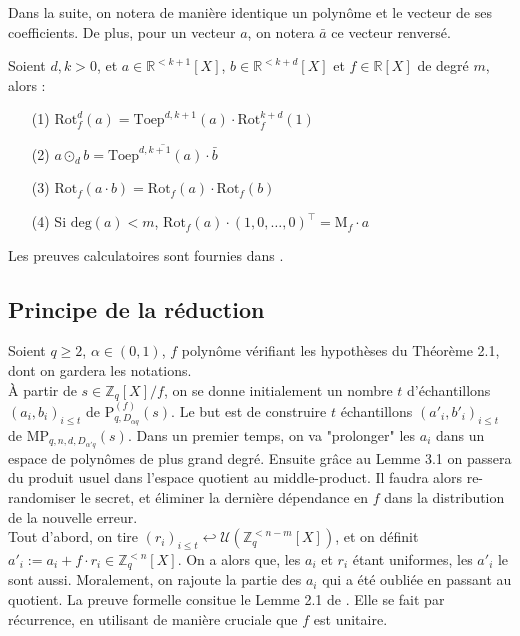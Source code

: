 \documentclass[11pt,a4paper]{article}
\begin{document}
Dans la suite, on notera de manière identique un polynôme et le vecteur de ses coefficients. De plus, pour un vecteur $a$, on notera $\bar a$ ce vecteur renversé. \\
\begin{lemma} Soient $d,k >0$, et $a \in \mathbb{R}^{<k+1}[X]$, $b \in \mathbb{R}^{<k+d}[X]$ et $f \in \mathbb{R}[X]$ de degré $m$, alors :
\begin{enumerate}
\item[(1)]$\text{Rot}^d_f(a) = \text{Toep}^{d,k+1}(a)\cdot\text{Rot}^{k+d}_f(1)$
\item[(2)] $a\odot_d b = \overline{\text{Toep}^{d,k+1}(a)\cdot \bar{b}}$
\item[(3)] $\text{Rot}_f(a\cdot b)=\text{Rot}_f(a)\cdot\text{Rot}_f(b)$
\item[(4)] Si $\text{deg}(a) < m$, $\text{Rot}_f(a)\cdot(1,0,\dots,0)^\top = \text{M}_f\cdot a$
\end{enumerate}
\end{lemma}
Les preuves calculatoires sont fournies dans \cite{mplwe}.

\subsection{Principe de la réduction}
Soient $q \geq 2$, $\alpha \in (0,1)$, $f$ polynôme vérifiant les hypothèses du Théorème 2.1, dont on gardera les notations. \\
 À partir de $s\in \mathbb{Z}_q[X]/f$, on se donne initialement un nombre $t$ d'échantillons $(a_i,b_i)_{i\leq t}$ de $\text{P}^{(f)}_{q,D_{\alpha q}}(s)$. Le but est de construire $t$ échantillons $(a'_i,b'_i)_{i\leq t}$ de $\text{MP}_{q,n,d,D_{\alpha'q}}(s)$. Dans un premier temps, on va "prolonger" les $a_i$ dans un espace de polynômes de plus grand degré. Ensuite grâce au Lemme 3.1 on passera du produit usuel dans l'espace quotient au middle-product. Il faudra alors re-randomiser le secret, et éliminer la dernière dépendance en $f$ dans la distribution de la nouvelle erreur. \\

Tout d'abord, on tire $(r_i)_{i\leq t} \hookleftarrow \mathcal{U}(\mathbb{Z}_q^{<n-m}[X])$, et on définit $a'_i := a_i + f\cdot r_i \in \mathbb{Z}_q^{<n}[X]$. On a alors que, les $a_i$ et $r_i$ étant uniformes, les $a'_i$ le sont aussi. Moralement, on rajoute la partie des $a_i$ qui a été oubliée en passant au quotient. La preuve formelle consitue le Lemme 2.1 de \cite{psis}. Elle se fait par récurrence, en utilisant de manière cruciale que $f$ est unitaire. \\
\end{document}
